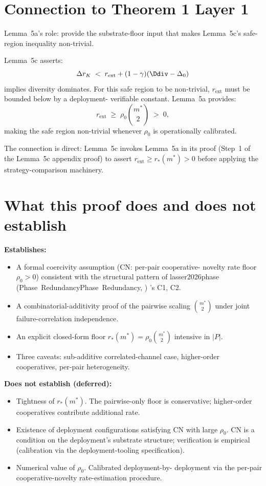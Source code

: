 \documentclass{article}
\makeatletter
\newcommand{\citep}[2][]{%
  \begingroup
  \def\@tmpkey{#2}%
  \ifx\@tmpkey\@empty\else
    (\ifx\@empty#1\@empty\else #1, \fi
     \@nameuse{bibkey@\@tmpkey})%
  \fi
  \endgroup
}
\newcommand{\rext}{r_{\mathrm{ext}}}
\makeatother
\begin{document}
\section{Connection to Theorem 1 Layer 1}

Lemma~5a's role: provide the substrate-floor input that makes
Lemma~5c's safe-region inequality non-trivial.

Lemma~5c asserts:
\[
  \Delta r_K \;<\; \rext + (1 - \gamma)(\Ddiv - \Delta_0)
\]
implies diversity dominates.  For this safe region to be
non-trivial, $\rext$ must be bounded below by a deployment-
verifiable constant.  Lemma~5a provides:
\[
  \rext \;\geq\; \rho_0 \binom{m^*}{2} \;>\; 0,
\]
making the safe region non-trivial whenever $\rho_0$ is
operationally calibrated.

The connection is direct: Lemma~5c invokes Lemma~5a in its proof
(Step~1 of the Lemma~5c appendix proof) to assert $\rext \geq
r_*(m^*) > 0$ before applying the strategy-comparison machinery.

\section{What this proof does and does not establish}

\textbf{Establishes:}
\begin{itemize}
\item A formal coercivity assumption (CN: per-pair cooperative-
  novelty rate floor $\rho_0 > 0$) consistent with the structural
  pattern of \citep[Phase~Redundancy]{lasser2026phase}'s C1, C2.
\item A combinatorial-additivity proof of the pairwise scaling
  $\binom{m^*}{2}$ under joint failure-correlation independence.
\item An explicit closed-form floor $r_*(m^*) = \rho_0 \binom{m^*}{2}$
  intensive in $|P|$.
\item Three caveats: sub-additive correlated-channel case,
  higher-order cooperatives, per-pair heterogeneity.
\end{itemize}

\textbf{Does not establish (deferred):}
\begin{itemize}
\item Tightness of $r_*(m^*)$.  The pairwise-only floor is
  conservative; higher-order cooperatives contribute additional
  rate.
\item Existence of deployment configurations satisfying CN with
  large $\rho_0$.  CN is a condition on the deployment's substrate
  structure; verification is empirical (calibration via the
  deployment-tooling specification).
\item Numerical value of $\rho_0$.  Calibrated deployment-by-
  deployment via the per-pair cooperative-novelty rate-estimation
  procedure.
\end{itemize}
\end{document}
